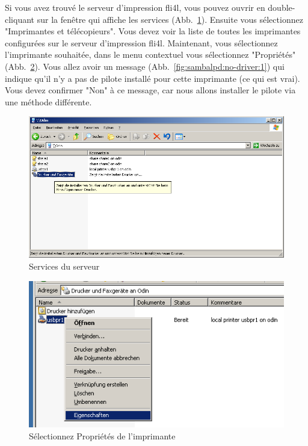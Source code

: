 Si vous avez trouvé le serveur d'impression fli4l, vous pouvez ouvrir en double-cliquant
sur la fenêtre qui affiche les services (Abb.~\ref{fig:sambalpd:services}).
Ensuite vous sélectionnez "Imprimantes et télécopieurs". Vous devez voir
la liste de toutes les imprimantes configurées sur le serveur d'impression fli4l.
Maintenant, vous sélectionnez l'imprimante souhaitée, dans le menu contextuel
vous sélectionnez "Propriétés" (Abb.~\ref{fig:sambalpd:printerproperties}).
Vous allez avoir un message (Abb.~\ref{fig:sambalpd:no-driver:1}) qui indique
qu'il n'y a pas de pilote installé pour cette imprimante (ce qui est vrai).
Vous devez confirmer "Non" à ce message, car nous allons installer le pilote
via une méthode différente.

\begin{figure}[hbt!]
\centering
\includegraphics[width=\columnwidth]{image006}
\caption{Services du serveur}
\label{fig:sambalpd:services}
\end{figure}

\begin{figure}[hbt!]
\centering
\includegraphics[width=\columnwidth]{image007}
\caption{Sélectionnez Propriétés de l'imprimante}
\label{fig:sambalpd:printerproperties}
\end{figure}

